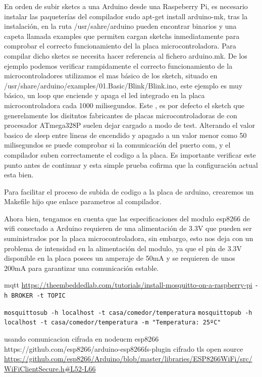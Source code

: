 En orden de subir sketcs a una Arduino desde una Raspeberry Pi, es necesario instalar las paqueterías del compilador sudo apt-get install arduino-mk, tras la instalación, en la ruta /usr/sahre/arduino pueden encontrar binarios y una capeta llamada examples que permiten cargan sketchs inmediatamente para comprobar el correcto funcionamiento del la placa microcontroladora. Para compilar dicho sketcs se necesita hacer referencia al fichero arduino.mk. De los ejemplo podemos verificar rampidamente el correcto funcionamiento de la microcontroladores utilizamos el mas básico de los \gls{sketch}, situado en /usr/share/arduino/examples/01.Basic/Blink/Blink.ino, este ejemplo es muy básico, un loop que enciende y apaga el led integrado en la placa microcontroladora cada 1000 milisegundos. Este , es por defecto el sketch que generelamente los disitntos fabricantes de placas microcontroladoras de con procesador ATmega328P suelen dejar cargado a modo de test. Alterando el valor basico de sleep entre lineas de encendido y apagado a un valor menor como 50 milisegundos se puede comprobar si la comunicación del puerto com, y el compilador suben correctamente el codigo a la placa. Es importante verificar este punto antes de continuar y esta simple prueba cofirma que la configuración actual esta bien.

Para facilitar el proceso de subida de codigo a la placa de arduino, crearemos un Makefile hijo que enlace parametros al compilador.


Ahora bien, tengamos en cuenta que las especificaciones del modulo esp8266 de wifi conectado a Arduino requieren de una alimentación de 3.3V que pueden ser suministrados por la placa microcontroladora, sin embargo, esto nos deja con un problema de intensidad en la alimentación del modulo, ya que el pin de 3.3V disponible en la placa posees un amperaje de 50mA y se requieren de unos 200mA para garantizar una comunicación estable.


mqtt
\url{https://theembeddedlab.com/tutorials/install-mosquitto-on-a-raspberry-pi}
\verb|-h BROKER -t TOPIC|

\verb|mosquittosub -h localhost -t casa/comedor/temperatura|
\verb|mosquittopub -h localhost -t casa/comedor/temperatura -m "Temperatura: 25ºC"|


usando comunicacion cifrada en nodeucm esp8266
https://github.com/esp8266/arduino-esp8266fs-plugin
cifrado tls open source
\url{https://github.com/esp8266/Arduino/blob/master/libraries/ESP8266WiFi/src/WiFiClientSecure.h#L52-L66}